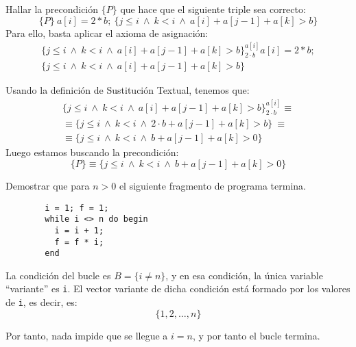 \begin{ejercicio}
    Hallar la precondición $\{P\}$ que hace que el siguiente triple sea correcto:
    \begin{equation*}
        \{P\}\ a[i]=2\ast b;\ \{j\leq i ~\land~ k < i ~\land~ a[i] + a[j-1]+a[k]>b\}
    \end{equation*}
    Para ello, basta aplicar el axioma de asignación:
    \begin{gather*}
        \{j\leq i~\land~ k < i ~\land~ a[i] + a[j-1]+a[k]>b\}_{2\cdot b}^{a[i]} a[i]=2\ast b;\\ \{j\leq i ~\land~ k < i ~\land~ a[i] + a[j-1]+a[k]>b\}
    \end{gather*}

    Usando la definición de Sustitución Textual, tenemos que:
    \begin{gather*}
        \{j\leq i~\land~ k < i ~\land~ a[i] + a[j-1]+a[k]>b\}_{2\cdot b}^{a[i]} \equiv \\ \equiv \{j\leq i ~\land~ k < i ~\land~ 2\cdot b + a[j-1]+a[k]>b\}
        \ \equiv\\ \equiv \{j\leq i ~\land~ k < i ~\land~ b + a[j-1]+a[k]>0\}
    \end{gather*}
    Luego estamos buscando la precondición:
    \begin{equation*}
        \{P\} \equiv \{j\leq i ~\land~ k < i ~\land ~b + a[j-1]+a[k]>0\}
    \end{equation*}
\end{ejercicio}

\begin{ejercicio}
    Demostrar que para $n>0$ el siguiente fragmento de programa termina.
    \begin{verbatim}
        i = 1; f = 1;
        while i <> n do begin
          i = i + 1;
          f = f * i;
        end
    \end{verbatim}

    La condición del bucle es $B=\{i \neq n\}$, y en esa condición, la única variable ``variante'' es \verb|i|.
    El vector variante de dicha condición está formado por los valores de \verb|i|, es decir, es:
    $$\{1, 2, \ldots, n\}$$

    Por tanto, nada impide que se llegue a $i=n$, y por tanto el bucle termina.
\end{ejercicio}

